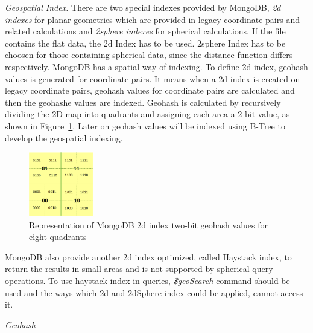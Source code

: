 \documentclass[a4paper,12pt]{article}
\begin{document}
\emph{Geospatial Index.}
There are two special indexes provided by MongoDB, \textit{2d indexes} for planar geometries 
which are provided in legacy coordinate pairs and related calculations 
and \textit{2sphere indexes} for spherical calculations. 
If the file contains the flat data, the 2d Index has to be used. 
2sphere Index has to be choosen for those containing spherical data, since the distance function differs respectively. 
MongoDB has a spatial way of indexing.
To define 2d index, geohash values is generated for coordinate pairs. 
It means when a 2d index is created on legacy coordinate pairs, geohash values for coordinate pairs are calculated 
and then the geohashe values are indexed. Geohash is calculated by recursively dividing the 2D map into quadrants 
and assigning each area a $2$-bit value, as shown in Figure~\ref{figmongoindex}. 
Later on geohash values will be indexed using B-Tree to develop the geospatial indexing. 
\begin{figure}
\centering
\includegraphics[width=0.25\textwidth]{MongoIndex}
\caption{Representation of MongoDB 2d index two-bit geohash values for eight quadrants}
\label{figmongoindex}
\end{figure}
MongoDB also provide another 2d index optimized, called Haystack index, to return the results in small areas and is not supported by spherical query operations. To use haystack index in queries, \textit{\$geoSearch} command should be used and the ways which 2d and 2dSphere index could be applied, cannot access it.


\emph{Geohash}
\end{document}
